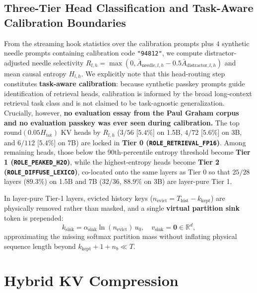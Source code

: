 \documentclass[conference]{IEEEtran}
\begin{document}
\subsection{Three-Tier Head Classification and Task-Aware Calibration Boundaries}
From the streaming hook statistics over the calibration prompts plus $4$ synthetic needle prompts containing calibration code \texttt{"94812"}, we compute distractor-adjusted needle selectivity $R_{l,h} = \max(0, \bar{A}_{\text{needle},l,h} - 0.5\bar{A}_{\text{distractor},l,h})$ and mean causal entropy $H_{l,h}$. We explicitly note that this head-routing step constitutes \textbf{task-aware calibration}: because synthetic passkey prompts guide identification of retrieval heads, calibration is informed by the broad long-context retrieval task class and is not claimed to be task-agnostic generalization. Crucially, however, \textbf{no evaluation essay from the Paul Graham corpus and no evaluation passkey was ever seen during calibration.} The top $\text{round}(0.05 H_{\text{tot}})$ KV heads by $R_{l,h}$ ($3/56$ [$5.4\%$] on 1.5B, $4/72$ [$5.6\%$] on 3B, and $6/112$ [$5.4\%$] on 7B) are locked in \textbf{Tier 0 (\texttt{ROLE\_RETRIEVAL\_FP16})}. Among remaining heads, those below the 90th-percentile entropy threshold become \textbf{Tier 1 (\texttt{ROLE\_PEAKED\_H2O})}, while the highest-entropy heads become \textbf{Tier 2 (\texttt{ROLE\_DIFFUSE\_LEXICO})}, co-located onto the same layers as Tier 0 so that $25/28$ layers ($89.3\%$) on 1.5B and 7B ($32/36$, $88.9\%$ on 3B) are layer-pure Tier 1.

In layer-pure Tier-1 layers, evicted history keys ($n_{\text{evict}} = T_{\text{hist}} - k_{\text{kept}}$) are physically removed rather than masked, and a single \textbf{virtual partition sink} token is prepended:
\begin{equation}
k_{\text{sink}} = \alpha_{\text{sink}}\ln(n_{\text{evict}})\,u_0, \quad v_{\text{sink}} = \mathbf{0} \in \mathbb{R}^d,
\label{eq:virtual_sink}
\end{equation}
approximating the missing softmax partition mass without inflating physical sequence length beyond $k_{\text{kept}} + 1 + n_b \ll T$.

\section{Hybrid KV Compression}
\end{document}
